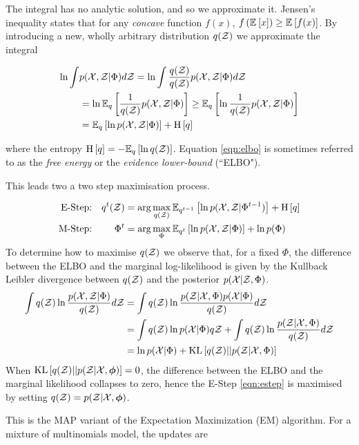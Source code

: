The integral has no analytic solution, and so we approximate it. Jensen's inequality states that for any \emph{concave} function $f(x)$, $f\left(\ex{x}{}\right) \geq \ex{f(x)}{}$. By introducing a new, wholly arbitrary distribution $q(\zdat)$ we approximate the integral

\begin{align}
 \ln \int & \joint d\zdat = \ln \int \frac{q(\zdat)}{q(\zdat)} \joint d\zdat\\ 
     &=  \ln \ex{\oneover{q(\zdat)}\joint}{q} \geq \ex{\ln \oneover{q(\zdat)}\joint}{q}\\
     &= \ex{\ln \joint}{q} + \ent{q} \label{eqn:elbo}
\end{align}

where the entropy $\ent{q} = -\ex{\ln q(\zdat)}{q}$. Equation \eqref{eqn:elbo} is sometimes referred to as the \emph{free energy} or the \emph{evidence lower-bound} (``ELBO").

This leads two a two step maximisation process.

\begin{align}
\text{E-Step:} & & q^t(\zdat) & = \arg \max_{q(\zdat)} \ex{\ln p(\xdat, \zdat|\Phi^{t-1})}{q^{t-1}} + \ent{q} \\
\text{M-Step:} & & \Phi^t & = \arg \max_{\Phi} \ex{\ln \joint}{q^{t}} + \ln p(\Phi)
\end{align}
To determine how to maximise $q(\zdat)$ we observe that, for a fixed $\Phi$, the difference between the ELBO and the marginal log-likelihood is given by the Kullback Leibler divergence between $q(\zdat)$ and the posterior $p(\xdat|\zdat, \Phi)$.
\begin{align}
\int q(\zdat) \ln \frac{p(\xdat, \zdat|\Phi)}{q(\zdat)} d\zdat
& = \int q(\zdat) \ln \frac{p(\zdat|\xdat, \Phi)p(\xdat | \Phi)}{q(\zdat)} d\zdat \\
& = \int q(\zdat) \ln p(\xdat | \Phi) q\zdat + \int q(\zdat)\ln\frac{p(\zdat|\xdat, \Phi)}{q(\zdat)} d\zdat \\
& = \ln p(\xdat | \Phi) + \kl{q(\zdat)}{p(\zdat|\xdat, \Phi)}
\end{align}
When $\kl{q(\zdat)}{p(\zdat|\xdat, \param)} = 0$, the difference between the ELBO and the marginal likelihood collapses to zero, hence the E-Step \eqref{eqn:estep} is maximised by setting $q(\zdat) = p(\zdat | \xdat, \param)$.

This is the MAP variant of the Expectation Maximization (EM) algorithm\cite{Dempster1977}. For a mixture of multinomials model, the updates are

